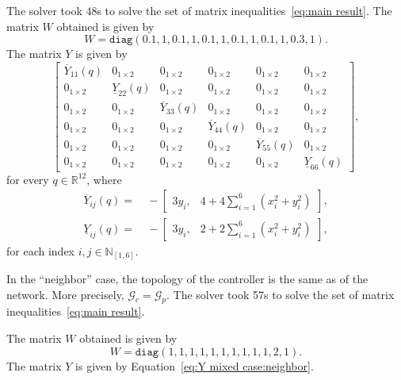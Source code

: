 \documentclass[10pt,twocolumn,twoside]{IEEEtran}
\newcounter{para}
\newcommand\mypara{\par}
\theoremstyle{plain}
\theoremstyle{definition}
\theoremstyle{remark}
\begin{document}
\mypara The solver took 48s to solve the set of matrix inequalities~\eqref{eq:main result}. The matrix $W$ obtained is given by
\begin{equation*}
	W=\mathbin{\mathtt{diag}}(0.1,1,0.1,1,0.1,1,0.1,1,0.1,1,0.3,1).
\end{equation*}
The matrix $Y$ is given by
\begin{equation*}
	\begin{bmatrix}
		\overline{Y}_{11}(q)&0_{1\times2}&0_{1\times2}&0_{1\times2}&0_{1\times2}&0_{1\times2}\\
		0_{1\times2}&\underline{Y}_{22}(q)&0_{1\times2}&0_{1\times2}&0_{1\times2}&0_{1\times2}\\
		0_{1\times2}&0_{1\times2}&\overline{Y}_{33}(q)&0_{1\times2}&0_{1\times2}&0_{1\times2}\\
		0_{1\times2}&0_{1\times2}&0_{1\times2}&\overline{Y}_{44}(q)&0_{1\times2}&0_{1\times2}\\
		0_{1\times2}&0_{1\times2}&0_{1\times2}&0_{1\times2}&\overline{Y}_{55}(q)&0_{1\times2}\\
		0_{1\times2}&0_{1\times2}&0_{1\times2}&0_{1\times2}&0_{1\times2}&\underline{Y}_{66}(q)
	\end{bmatrix},
\end{equation*}
for every $q\in\mathbb{R}^{12}$, where 
\begin{align*}
 \overline{Y}_{ij}(q)=&\ -\begin{bmatrix}3y_i,&4+4\sum_{i=1}^6(x_i^2+y_i^2)\end{bmatrix},\\
 \underline{Y}_{ij}(q)=&\ -\begin{bmatrix}3y_i,&2+2\sum_{i=1}^6(x_i^2+y_i^2)\end{bmatrix},
\end{align*}
for each index $i,j\in\mathbb{N}_{[1,6]}$.

\mypara In the ``neighbor'' case, the topology of the controller is the same as of the network. More precisely, $\mathscr{G}_c=\mathscr{G}_p$. The solver took 57s to solve the set of matrix inequalities~\eqref{eq:main result}.

\mypara The matrix $W$ obtained is given by
\begin{equation*}
	W=\mathbin{\mathtt{diag}}(1,1,1,1,1,1,1,1,1,1,2,1).
\end{equation*} 
The matrix $Y$ is given by Equation~\eqref{eq:Y mixed case:neighbor}.
\end{document}

